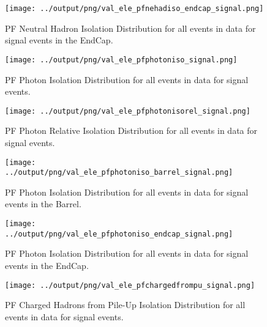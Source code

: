 \documentclass[11pt]{book}
\begin{document}
\begin{figure}[htb]
\centering
\texttt{[image: ../output/png/val\_ele\_pfnehadiso\_endcap\_signal.png]}
\caption{PF Neutral Hadron Isolation Distribution for all events in data for signal events in the EndCap.}
\label{fig:val_ele_pfnehadiso_endcap_signal}
\end{figure}

\begin{figure}[htb]
\centering
\texttt{[image: ../output/png/val\_ele\_pfphotoniso\_signal.png]}
\caption{PF Photon Isolation Distribution for all events in data for signal events.}
\label{fig:val_ele_pfphotoniso_signal}
\end{figure}

\begin{figure}[htb]
\centering
\texttt{[image: ../output/png/val\_ele\_pfphotonisorel\_signal.png]}
\caption{PF Photon Relative Isolation Distribution for all events in data for signal events.}
\label{fig:val_ele_pfphotonisorel_signal}
\end{figure}

\begin{figure}[htb]
\centering
\texttt{[image: ../output/png/val\_ele\_pfphotoniso\_barrel\_signal.png]}
\caption{PF Photon Isolation Distribution for all events in data for signal events in the Barrel.}
\label{fig:val_ele_pfphotoniso_barrel_signal}
\end{figure}

\begin{figure}[htb]
\centering
\texttt{[image: ../output/png/val\_ele\_pfphotoniso\_endcap\_signal.png]}
\caption{PF Photon Isolation Distribution for all events in data for signal events in the EndCap.}
\label{fig:val_ele_pfphotoniso_endcap_signal}
\end{figure}

\begin{figure}[htb]
\centering
\texttt{[image: ../output/png/val\_ele\_pfchargedfrompu\_signal.png]}
\caption{PF Charged Hadrons from Pile-Up Isolation Distribution for all events in data for signal events.}
\label{fig:val_ele_pfchargedfrompu_signal}
\end{figure}

\end{document}
